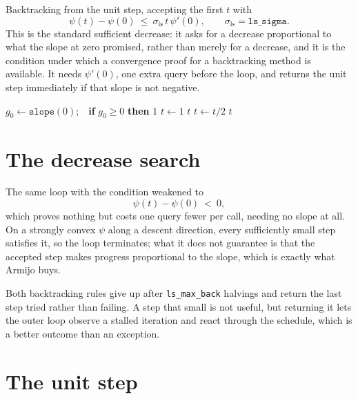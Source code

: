 \documentclass[a4paper,11pt]{book}
\theoremstyle{plain}
\theoremstyle{definition}
\theoremstyle{remark}
\numberwithin{equation}{chapter}
\numberwithin{algorithm}{chapter}
\begin{document}
	Backtracking from the unit step, accepting the first $t$ with
	\begin{equation}
		\psi(t)-\psi(0)\ \leq\ \sigma_{\mathrm{ls}}\,t\,\psi'(0) ,
		\qquad \sigma_{\mathrm{ls}}=\texttt{ls\_sigma} .
	\end{equation}
	This is the standard sufficient decrease: it asks for a decrease proportional
	to what the slope at zero promised, rather than merely for a decrease, and it
	is the condition under which a convergence proof for a backtracking method is
	available. It needs $\psi'(0)$, one extra query before the loop, and returns
	the unit step immediately if that slope is not negative.

	\begin{algorithm}[H]
		\caption{\texttt{armijo\_search}}
		\begin{algorithmic}[1]
			\State $g_0\gets\texttt{slope}(0)$;\ \ \textbf{if} $g_0\geq0$
			\textbf{then} \Return $1$
			\State $t\gets1$
			\State \Return $t$
			\EndIf
			\State $t\gets t/2$
			\EndFor
			\State \Return $t$
		\end{algorithmic}
	\end{algorithm}

	\section{The decrease search}

	The same loop with the condition weakened to
	\begin{equation}
		\psi(t)-\psi(0)\ <\ 0 ,
	\end{equation}
	which proves nothing but costs one query fewer per call, needing no slope at
	all. On a strongly convex $\psi$ along a descent direction, every sufficiently
	small step satisfies it, so the loop terminates; what it does not guarantee is
	that the accepted step makes progress proportional to the slope, which is
	exactly what Armijo buys.

	Both backtracking rules give up after \texttt{ls\_max\_back} halvings and
	return the last step tried rather than failing. A step that small is not
	useful, but returning it
	lets the outer loop observe a stalled iteration and react through the
	schedule, which is a better outcome than an exception.

	\section{The unit step}
\end{document}
